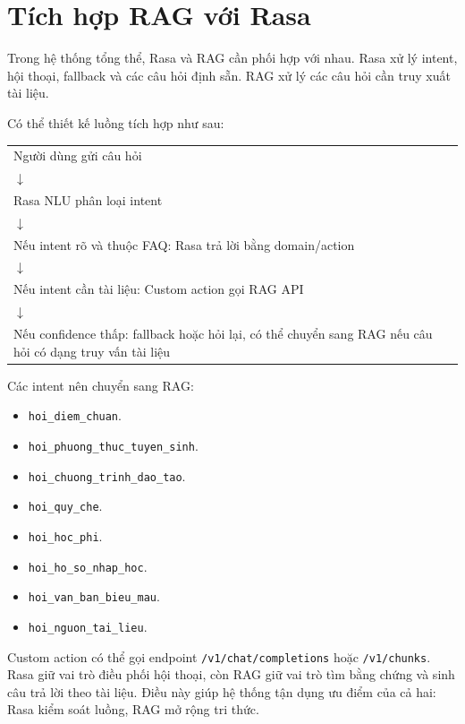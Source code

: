 \section{Tích hợp RAG với Rasa}

Trong hệ thống tổng thể, Rasa và RAG cần phối hợp với nhau. Rasa xử lý intent, hội thoại, fallback và các câu hỏi định sẵn. RAG xử lý các câu hỏi cần truy xuất tài liệu.

Có thể thiết kế luồng tích hợp như sau:

\begin{center}
\begin{tabular}{p{12cm}}
Người dùng gửi câu hỏi \\
$\downarrow$ \\
Rasa NLU phân loại intent \\
$\downarrow$ \\
Nếu intent rõ và thuộc FAQ: Rasa trả lời bằng domain/action \\
$\downarrow$ \\
Nếu intent cần tài liệu: Custom action gọi RAG API \\
$\downarrow$ \\
Nếu confidence thấp: fallback hoặc hỏi lại, có thể chuyển sang RAG nếu câu hỏi có dạng truy vấn tài liệu
\end{tabular}
\end{center}

Các intent nên chuyển sang RAG:

\begin{itemize}
    \item \texttt{hoi\_diem\_chuan}.
    \item \texttt{hoi\_phuong\_thuc\_tuyen\_sinh}.
    \item \texttt{hoi\_chuong\_trinh\_dao\_tao}.
    \item \texttt{hoi\_quy\_che}.
    \item \texttt{hoi\_hoc\_phi}.
    \item \texttt{hoi\_ho\_so\_nhap\_hoc}.
    \item \texttt{hoi\_van\_ban\_bieu\_mau}.
    \item \texttt{hoi\_nguon\_tai\_lieu}.
\end{itemize}

Custom action có thể gọi endpoint \texttt{/v1/chat/completions} hoặc \texttt{/v1/chunks}. Rasa giữ vai trò điều phối hội thoại, còn RAG giữ vai trò tìm bằng chứng và sinh câu trả lời theo tài liệu. Điều này giúp hệ thống tận dụng ưu điểm của cả hai: Rasa kiểm soát luồng, RAG mở rộng tri thức.
